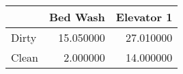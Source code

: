 \begin{tabular}{lrr}
\toprule
 & Bed Wash & Elevator 1 \\
\midrule
Dirty & 15.050000 & 27.010000 \\
Clean & 2.000000 & 14.000000 \\
\bottomrule
\end{tabular}
